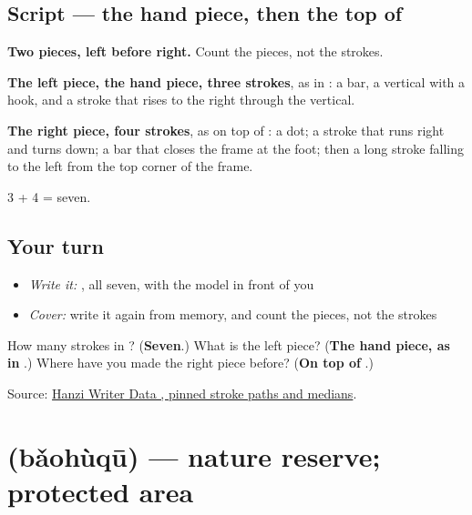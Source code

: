\subsection*{Script — the hand piece, then the top of }

\begin{quote}
\end{quote}

\textbf{Two pieces, left before right.} Count the pieces, not the strokes.

\textbf{The left piece, the hand piece, three strokes}, as in : a bar, a vertical with a hook, and a stroke that rises to the right through the vertical.

\textbf{The right piece, four strokes}, as on top of : a dot; a stroke that runs right and turns down; a bar that closes the frame at the foot; then a long stroke falling to the left from the top corner of the frame.

3 + 4 = seven.

\subsection*{Your turn}
\begin{itemize}
\raggedright
  \item \emph{Write it:} , all seven, with the model in front of you
  \item \emph{Cover:} write it again from memory, and count the pieces, not the strokes
\end{itemize}

\begin{tcolorbox}[breakable,colback=teal!4,colframe=teal!35!black,title={Before you move on}]
How many strokes in ? (\textbf{Seven}.) What is the left piece? (\textbf{The hand piece, as in }.) Where have you made the right piece before? (\textbf{On top of }.)

Source: \href{https://raw.githubusercontent.com/chanind/hanzi-writer-data/68d10a4b21150cae5e1ebbd223eed289cf32d90c/data/\%E6\%8A\%A4.json}{Hanzi Writer Data , pinned stroke paths and medians}.
\end{tcolorbox}
\section[\texorpdfstring{\zh{保护区} (bǎohùqū)}{保护区 (bǎohùqū)}]{ (bǎohùqū) — nature reserve; protected area}

